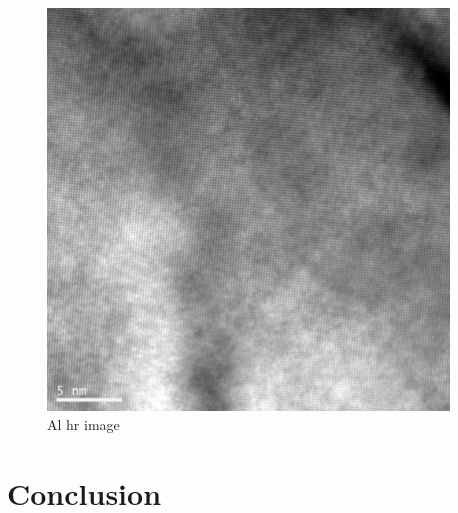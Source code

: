 \documentclass[12pt,a4paper]{article}
\begin{document}
\begin{figure}[htbp]
  \centering
  \includegraphics[width=0.95\textwidth]{data/Image5 Au_HRTEM.png}
  \caption{Al \ac{hr} image}
  \label{fig:hr_au}
\end{figure}



\section{Conclusion} %



 
 \nocite{*}
\end{document}
